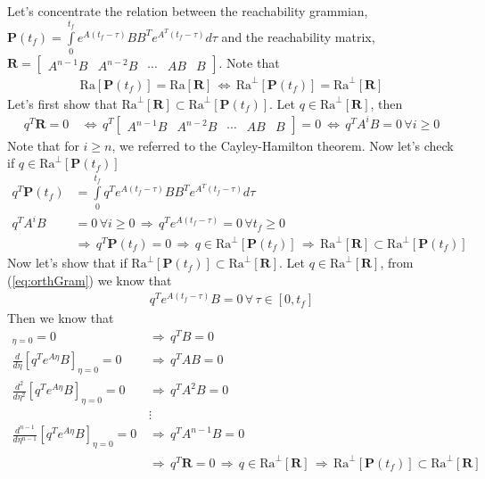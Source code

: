 \documentclass[twoside]{article}
\begin{document}
Let's concentrate the relation between the reachability grammian, $\textbf{P}(t_f) = \int\limits_{0}^{t_f} e^{A (t_f - \tau)} B B^T e^{A^T (t_f - \tau)}  d \tau $ 
and the reachability matrix, $\mathbf{R} = \left[ \begin{array}{c|c|c|c|c} A^{n-1} B & A^{n-2} B & \cdots & A B & B \end{array} \right] $. Note that 
%
\begin{align*}
  \mathrm{Ra}[ \textbf{P}(t_f) ] = \mathrm{Ra}[ \mathbf{R} ]
  \, \iff \, \mathrm{Ra}^\perp [ \textbf{P}(t_f) ] = \mathrm{Ra}^\perp [ \mathbf{R} ]
\end{align*}
%
Let's first show that $\mathrm{Ra}^\perp [ \mathbf{R} ] \subset \mathrm{Ra}^\perp [ \textbf{P}(t_f) ]$.
Let $q \in \mathrm{Ra}^\perp [ \mathbf{R} ] $, then 
%
\begin{align*}
  q^T \mathbf{R} = 0 \, &\iff \, q^T \left[ \begin{array}{c|c|c|c|c} A^{n-1} B & A^{n-2} B & \cdots & A B & B \end{array} \right] = 0 \ \iff \, q^T A^i B = 0 \, \forall i \ge 0
\end{align*}
%
Note that for $i \geq n$, we referred to the Cayley-Hamilton theorem. Now let's check if 
$q \in \mathrm{Ra}^\perp [ \mathbf{P}(t_f) ] $
%
\begin{align*}
  q^T \mathbf{P}(t_f) &= \int\limits_{0}^{t_f} q^T e^{A (t_f - \tau)} B B^T e^{A^T (t_f - \tau)}  d \tau 
  \\
  q^T A^i B &= 0 \, \forall i \ge 0 \, \Rightarrow \, q^T e^{A (t_f - \tau)} = 0 \, \forall t_f \geq 0
  \\
  &\Rightarrow \, q^T \mathbf{P}(t_f) = 0 \, \Rightarrow \, q \in \mathrm{Ra}^\perp [ \mathbf{P}(t_f) ]
  \, \Rightarrow \, \mathrm{Ra}^\perp [ \mathbf{R} ] \subset \mathrm{Ra}^\perp [ \textbf{P}(t_f) ]
\end{align*}
%
Now let's show that if $\mathrm{Ra}^\perp [ \textbf{P}(t_f) ] \subset \mathrm{Ra}^\perp [ \mathbf{R} ]$.
Let $q \in \mathrm{Ra}^\perp [ \mathbf{R} ] $, from (\ref{eq:orthGram}) we know that 
%
\begin{align*}
  q^T e^{A (t_f - \tau)} B = 0 \, \forall \, \tau \in [0 , t_f]
\end{align*}
%
Then we know that 
%
\begin{align*}
  [ q^T e^{A \eta} B]_{\eta = 0} = 0 \, &\Rightarrow \, q^T B = 0
  \\
  \frac{d}{d\eta}[ q^T e^{A \eta} B]_{\eta = 0} = 0 \, &\Rightarrow \, q^T A B = 0
  \\
  \frac{d^2}{d\eta^2}[ q^T e^{A \eta} B]_{\eta = 0} = 0 \, &\Rightarrow \, q^T A^2 B = 0
  \\
  &\vdots
    \\
    \frac{d^{n-1}}{d\eta^{n-1}}[ q^T e^{A \eta} B]_{\eta = 0} = 0 \, &\Rightarrow \, q^T A^{n-1} B = 0
    \\
    &\Rightarrow \, q^T \mathbf{R} = 0 \, \Rightarrow \, q \in \mathrm{Ra}^\perp [ \mathbf{R} ]
    \, \Rightarrow \, \mathrm{Ra}^\perp [ \textbf{P}(t_f) ] \subset \mathrm{Ra}^\perp [ \mathbf{R} ]
\end{align*}
\end{document}
